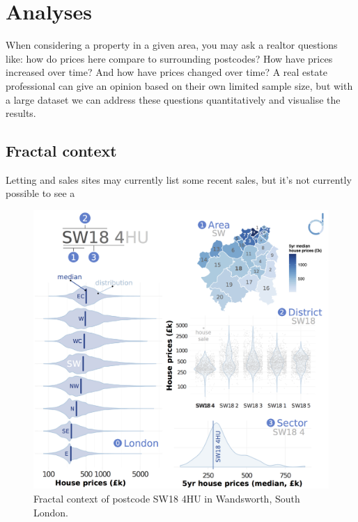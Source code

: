 \documentclass[
10pt, %
a4paper, %
oneside, %
headinclude,footinclude, %
BCOR5mm, %
]{scrartcl}
\begin{document}



\vspace{-1em}
\section*{Analyses}

When considering a property in a given area, you may ask a realtor
questions like: how do prices here compare to surrounding postcodes?
How have prices increased over time? And how have prices changed over
time? A real estate professional can give an opinion based on their
own limited sample size, but with a large dataset we can address these
questions quantitatively and visualise the results.

\subsection*{Fractal context}

Letting and sales sites may currently list some recent sales, but it's
not currently possible to see a

\begin{figure}
\vspace{.5em}
\centering
\includegraphics[width=.43\textwidth]{Figures/fractal.png}
\caption{ Fractal context of postcode SW18 4HU in Wandsworth, South London.}
\end{figure}
\end{document}
